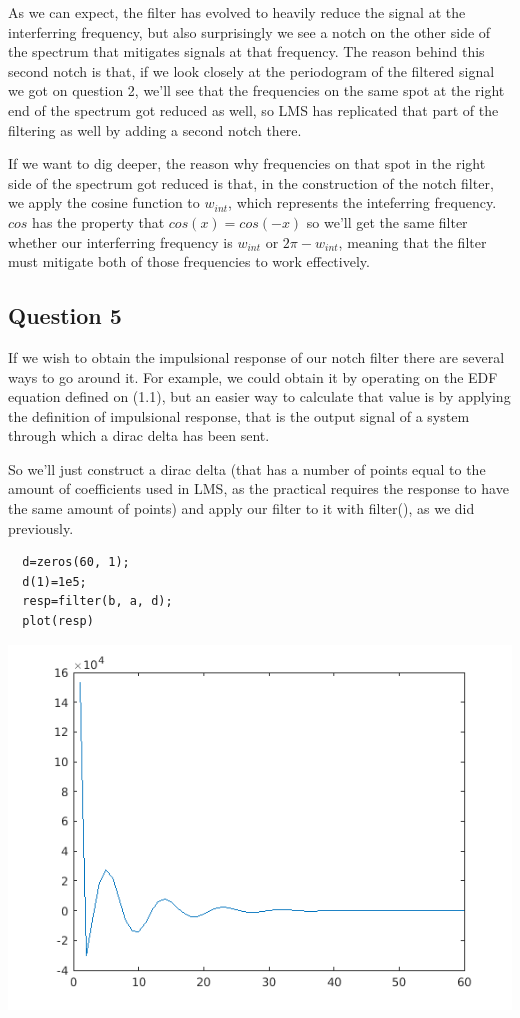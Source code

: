 \documentclass[conference,9pt]{IEEEtran}
\begin{document}
As we can expect, the filter has evolved to heavily reduce the signal at the interferring frequency, but also surprisingly we see a notch on the other side of the spectrum that mitigates signals at that frequency. The reason behind this second notch is that, if we look closely at the periodogram of the filtered signal we got on question 2, we'll see that the frequencies on the same spot at the right end of the spectrum got reduced as well, so LMS has replicated that part of the filtering as well by adding a second notch there.

If we want to dig deeper, the reason why frequencies on that spot in the right side of the spectrum got reduced is that, in the construction of the notch filter, we apply the cosine function to $w_{int}$, which represents the inteferring frequency. $cos$ has the property that $cos(x)=cos(-x)$ so we'll get the same filter whether our interferring frequency is $w_{int}$ or $2\pi-w_{int}$, meaning that the filter must mitigate both of those frequencies to work effectively.

\subsection{Question 5}
If we wish to obtain the impulsional response of our notch filter there are several ways to go around it. For example, we could obtain it by operating on the EDF equation defined on (1.1), but an easier way to calculate that value is by applying the definition of impulsional response, that is the output signal of a system through which a dirac delta has been sent.

So we'll just construct a dirac delta (that has a number of points equal to the amount of coefficients used in LMS, as the practical requires the response to have the same amount of points) and apply our filter to it with filter(), as we did previously.

\begin{verbatim}
  d=zeros(60, 1);
  d(1)=1e5;
  resp=filter(b, a, d);
  plot(resp)
\end{verbatim}

\includegraphics[scale=0.6]{imp-resp.png}
\end{document}
